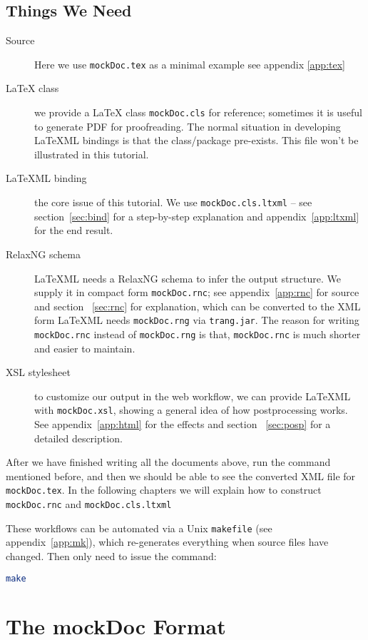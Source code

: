 \documentclass[a4paper]{article}
\def\latexml{{\LaTeX}ML\xspace}
\begin{document}
\subsection{Things We Need}
\begin{description}
\item[Source] Here we use \lstinline|mockDoc.tex| as a minimal example see appendix \ref{app:tex} \item[{\LaTeX} class] we provide a {\LaTeX} class \lstinline|mockDoc.cls| for reference; sometimes it is useful to generate PDF for proofreading. The  normal situation in
  developing \latexml bindings is that the class/package pre-exists. This file won't be
  illustrated in this tutorial. 
\item[\latexml binding] the core issue of this tutorial. We use \lstinline|mockDoc.cls.ltxml|
  -- see section~\ref{sec:bind} for a step-by-step explanation and appendix~\ref{app:ltxml}
  for the end result.
\item[RelaxNG schema] \latexml needs a RelaxNG schema to infer the output structure. We
  supply it in compact form \lstinline|mockDoc.rnc|; see appendix~\ref{app:rnc} for source and section ~\ref{sec:rnc} for explanation, which
  can be converted to the XML form \latexml needs \lstinline|mockDoc.rng| via
  \lstinline|trang.jar|.  The reason for writing \lstinline|mockDoc.rnc| instead of
  \lstinline|mockDoc.rng| is that, \lstinline|mockDoc.rnc| is much shorter and easier to
  maintain. 
\item[XSL stylesheet] to customize our output in the web workflow, we can provide \latexml with 
  \lstinline|mockDoc.xsl|, showing a general idea of how postprocessing works. See appendix~\ref{app:html}
  for the effects and section ~\ref{sec:posp} for a detailed description.
\end{description} 
After we have finished writing all the documents above, run the command mentioned before,
and then we should be able to see the converted XML file for \lstinline|mockDoc.tex|. In
the following chapters we will explain how to construct \lstinline|mockDoc.rnc| and
\lstinline|mockDoc.cls.ltxml|


These workflows can be automated via a Unix \lstinline|makefile| (see
appendix~\ref{app:mk}), which re-generates everything when source files have changed. Then
only need to issue the command:
\begin{lstlisting}[language=bash]
make
\end{lstlisting}

\section{The mockDoc Format}\label{sec:mockdoc}
\end{document}
